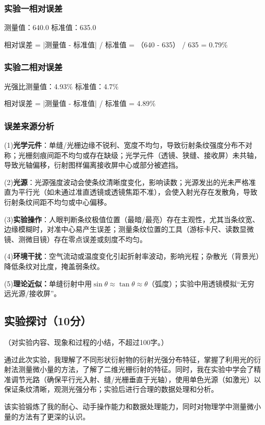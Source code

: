 \documentclass[]{../模板/Report}%
\begin{document}
\begin{fullreportonly}
\subsubsection{实验一相对误差}
测量值：640.0 \quad 标准值：635.0
\par
相对误差 = |测量值 - 标准值| / 标准值 = （640 - 635） / 635 = 0.79\%

\subsubsection{实验二相对误差}
光强比测量值：4.93\% \quad 标准值：4.7\% 
\par
相对误差 = |测量值 - 标准值| / 标准值 = 4.89\%

\subsubsection{误差来源分析}
(1)\textbf{光学元件}：单缝/光栅边缘不锐利、宽度不均匀，导致衍射条纹强度分布不对称；光栅刻痕间距不均匀或存在缺级；光学元件（透镜、狭缝、接收屏）未共轴，导致光轴偏移，衍射图样偏离接收屏中心或部分被遮挡。
\par

(2)\textbf{光源}：光源强度波动会使条纹清晰度变化，影响读数；光源发出的光未严格准直为平行光（如未通过准直透镜或透镜焦距不准），会使入射光存在发散角，导致衍射条纹间距不均匀或中心偏移。
\par

(3)\textbf{实验操作}：人眼判断条纹极值位置（最暗/最亮）存在主观性，尤其当条纹宽、边缘模糊时，对准中心易产生误差；测量条纹位置的工具（游标卡尺、读数显微镜、测微目镜）存在零点误差或刻度不均匀。
\par

(4)\textbf{环境干扰}：空气流动或温度变化引起折射率波动，影响光程；杂散光（背景光）降低条纹对比度，掩盖弱条纹。
\par

(5)\textbf{理论近似：}单缝衍射中用$\sin \theta \approx \tan \theta \approx \theta$（弧度）；实验中用透镜模拟“无穷远光源/接收屏”。


\subsection{实验探讨（10分）}
（对实验内容、现象和过程的小结，不超过100字。）
\par
通过此次实验，我理解了不同形状衍射物的衍射光强分布特征，掌握了利用光的衍射法测量微小量的方法，了解了二维光栅衍射的特征。同时，我在实验中学会了精准调节光路（确保平行光入射、缝/光栅垂直于光轴），使用单色光源（如激光）以保证条纹清晰，观测光强分布；实验后进行合理的数据处理和分析。
\par
该实验锻炼了我的耐心、动手操作能力和数据处理能力，同时对物理学中测量微小量的方法有了更深的认识。


\end{fullreportonly}
\end{document}
